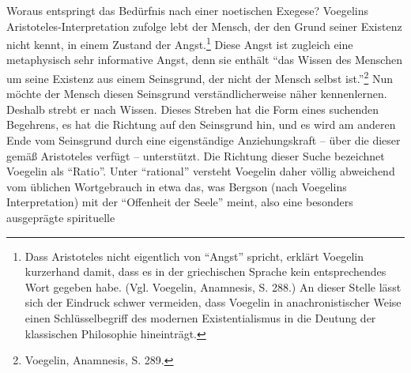 Woraus entspringt das Bedürfnis nach einer noetischen Exegese? Voegelins
Aristoteles-Interpretation zufolge lebt der Mensch, der den Grund seiner
Existenz nicht kennt, in einem Zustand der Angst.\footnote{Dass Aristoteles
  nicht eigentlich von "`Angst"' spricht, erklärt Voegelin kurzerhand damit,
  dass es in der griechischen Sprache kein entsprechendes Wort gegeben habe.
  (Vgl. Voegelin, Anamnesis, S. 288.)  An dieser Stelle lässt sich der
  Eindruck schwer vermeiden, dass Voegelin in anachronistischer Weise einen
  Schlüsselbegriff des modernen Existentialismus in die Deutung der
  klassischen Philosophie hineinträgt.}  Diese Angst ist zugleich eine
metaphysisch sehr informative Angst, denn sie enthält "`das Wissen des
Menschen um seine Existenz aus einem Seinsgrund, der nicht der Mensch selbst
ist."'\footnote{Voegelin, Anamnesis, S. 289.} Nun möchte der Mensch diesen
Seinsgrund verständlicherweise näher kennenlernen.  Deshalb strebt er nach
Wissen. Dieses Streben hat die Form eines suchenden Begehrens, es hat die
Richtung auf den Seinsgrund hin, und es wird am anderen Ende vom Seinsgrund
durch eine eigenständige Anziehungskraft -- über die dieser gemäß Aristoteles
verfügt -- unterstützt. \label{Rationalitaetsbegriff} Die Richtung dieser Suche
bezeichnet Voegelin als "`Ratio"'. Unter "`rational"' versteht Voegelin daher
völlig abweichend vom üblichen Wortgebrauch in etwa das, was Bergson (nach
Voegelins Interpretation) mit der "`Offenheit der Seele"' meint, also eine
besonders ausgeprägte spirituelle
